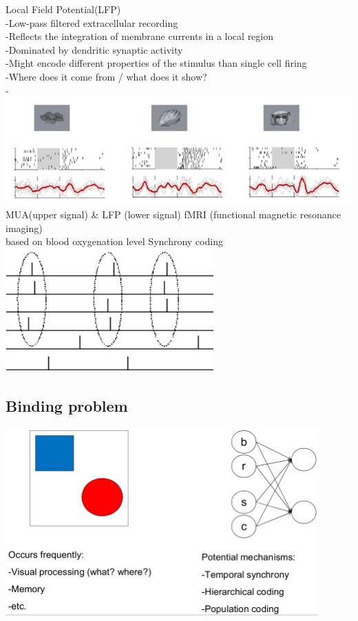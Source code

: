 \documentclass[english,11pt]{article}
\begin{document}
\begin{itemize}
\subitem Local Field Potential(LFP)\\
-Low-pass filtered extracellular recording\\
-Reflects the integration of membrane currents in a local region\\
-Dominated by dendritic synaptic activity\\
-Might encode different properties of the stimulus than single cell firing\\
-Where does it come from / what does it show?\\
-\includegraphics[width=\textwidth]{MUA-LFP.png}\\
MUA(upper signal) \& LFP (lower signal)
\subitem fMRI (functional magnetic resonance imaging)\\ based on blood oxygenation level
\subitem Synchrony coding\\
\includegraphics[width=0.6\textwidth]{synchrony-code.png}
\end{itemize}
\subsection{Binding problem}
\includegraphics[width=0.9\textwidth]{binding-problem.png}
\end{document}
